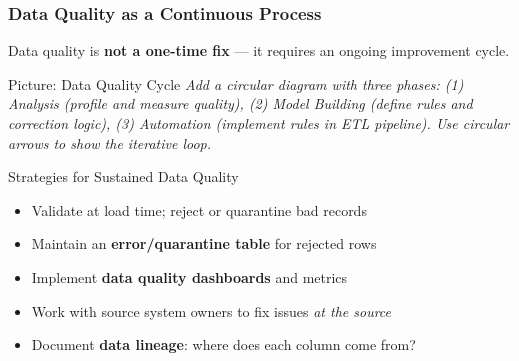 \begin{frame}
  \frametitle{Data Quality as a Continuous Process}

  Data quality is \textbf{not a one-time fix} --- it requires an ongoing
  improvement cycle.

  \begin{alertblock}{Picture: Data Quality Cycle}
    \textit{Add a circular diagram with three phases:
    (1) Analysis (profile and measure quality),
    (2) Model Building (define rules and correction logic),
    (3) Automation (implement rules in ETL pipeline).
    Use circular arrows to show the iterative loop.}
  \end{alertblock}

  \begin{block}{Strategies for Sustained Data Quality}
    \begin{itemize}
      \item Validate at load time; reject or quarantine bad records
      \item Maintain an \textbf{error/quarantine table} for rejected rows
      \item Implement \textbf{data quality dashboards} and metrics
      \item Work with source system owners to fix issues \textit{at the source}
      \item Document \textbf{data lineage}: where does each column come from?
    \end{itemize}
  \end{block}
\end{frame}


